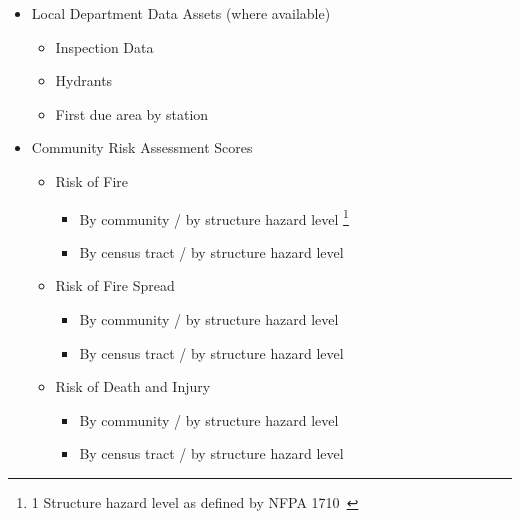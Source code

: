 \documentclass[12pt,oneside]{book}
\begin{document}
\begin{itemize}[noitemsep]
\begin{itemize}[noitemsep]
  \end{itemize}
\item Local Department Data Assets (where available)
  \begin{itemize}[noitemsep]
  \item Inspection Data
  \item Hydrants
  \item First due area by station
  \end{itemize}
\clearpage
\item Community Risk Assessment Scores
  \begin{itemize}[noitemsep]
  \item Risk of Fire
  \begin{itemize}[noitemsep]
    \item By community / by structure hazard level \footnote{1 Structure hazard level as defined by NFPA 1710~\cite{nfpa_1710}}
    \item By census tract / by structure hazard level
  \end{itemize}
  \item Risk of Fire Spread
    \begin{itemize}[noitemsep]
    \item By community / by structure hazard level
    \item By census tract / by structure hazard level
    \end{itemize}
  \item Risk of Death and Injury
    \begin{itemize}[noitemsep]
    \item By community / by structure hazard level
    \item By census tract / by structure hazard level
    \end{itemize}
  \end{itemize}
\end{itemize}
\end{document}
